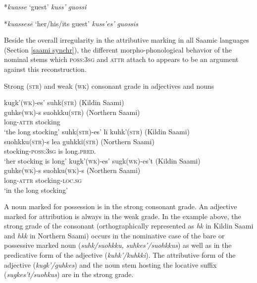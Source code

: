 {\begin{exe}
\ex
\begin{xlist}
\ex
\begin{xlist}
	*\textit{kuasse} ‘guest’
	\textit{kuss'}
 \textit{guossi}
\end{xlist}
\ex
\begin{xlist}
	*\textit{kuassesē} ‘her/his/its guest’
	\textit{kuss'es'}
 \textit{guossis}
\end{xlist}
\end{xlist}
\end{exe}
Beside the overall irregularity in the attributive marking in all Saamic languages (Section \ref{saami synchr}), the different morpho-phonological behavior of the nominal stems which \textsc{poss:3sg} and \textsc{attr} attach to appears to be an argument against this reconstruction. 

\begin{exe}
\ex Strong (\textsc{str}) and weak (\textsc{wk}) consonant grade in adjectives and nouns
\begin{xlist}
\ex 
\glll 	kugk'(\textsc{wk})-es' suhk(\textsc{str}) {(Kildin Saami)} \\
	guhke(\textsc{wk})-s suohkku(\textsc{str}) {(Northern Saami)}\\
	long-\textsc{attr} stocking\\
\glt	‘the long stocking’
\ex 
\glll	suhk(\textsc{str})-es' lī kuhk'(\textsc{str}) {(Kildin Saami)}\\
	suohkku(\textsc{str})-s lea guhkki(\textsc{str}) {(Northern Saami)}\\
	stocking-\textsc{poss:3sg} is long.\textsc{pred.}\\
\glt	‘her stocking is long’
\ex
\glll	kugk'(\textsc{wk})-es' sugk(\textsc{wk})-es't {(Kildin Saami)}\\
	guhke(\textsc{wk})-s suohku(\textsc{wk})-s {(Northern Saami)}\\
	long-\textsc{attr} stocking-\textsc{loc.sg}\\
\glt	‘in the long stocking’
\end{xlist}
\end{exe}
A noun marked for possession is in the strong consonant grade. An adjective marked for attribution is always in the weak grade. In the example above, the strong grade of the consonant (orthographically represented as \textit{hk} in Kildin Saami and \textit{hkk} in Northern Saami) occurs in the nominative case of the bare or possessive marked noun (\textit{suhk/suohkku, suhkes'/suohkkus}) as well as in the predicative form of the adjective (\textit{kuhk'/kuhkki}). The attributive form of the adjective (\textit{kugk'/guhkes}) and the noun stem hosting the locative suffix (\textit{sugkes't/suohkus}) are in the strong grade.

}
